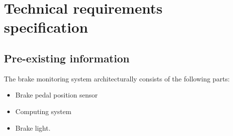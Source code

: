 \section{Technical requirements specification}
%
% 

\subsection{Pre-existing information}
%
The brake monitoring system architecturally consists of the following parts:
\begin{itemize}
\item Brake pedal position sensor
\item Computing system
\item Brake light.
\end{itemize}

%
%
%
%
%
%
